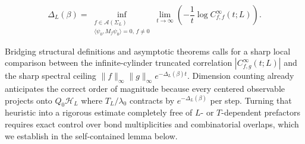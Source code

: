 \documentclass[11pt]{article}
\theoremstyle{definition}
\begin{document}
\[
  \Delta_L(\beta) = \inf_{\substack{f \in \mathcal{A}(\Sigma_L) \\ \langle \psi_0, M_f \psi_0 \rangle = 0,\, f \neq 0}} \lim_{t \to \infty} \left(-\frac{1}{t} \log C_{f,f}^\infty(t; L)\right).
\]

Bridging structural definitions and asymptotic theorems calls for a sharp local
comparison between the infinite-cylinder truncated correlation $|C_{f,g}^\infty(t;
L)|$ and the sharp spectral ceiling $\|f\|_\infty \|g\|_\infty e^{-\Delta_L(\beta)
t}$. Dimension counting already anticipates the correct order of magnitude because
every centered observable projects onto $Q_0 \mathcal{H}_L$ where $T_L / \lambda_0$
contracts by $e^{-\Delta_L(\beta)}$ per step. Turning that heuristic into a rigorous
estimate completely free of $L$- or $T$-dependent prefactors requires exact control
over bond multiplicities and combinatorial overlaps, which we establish in the
self-contained lemma below.
\end{document}
